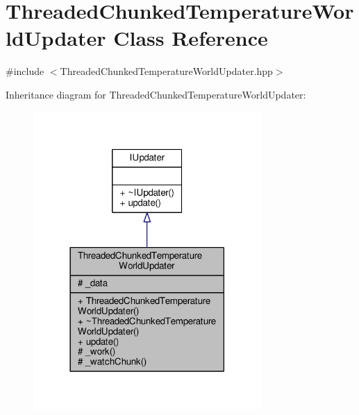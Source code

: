 \hypertarget{class_threaded_chunked_temperature_world_updater}{\section{Threaded\-Chunked\-Temperature\-World\-Updater Class Reference}
\label{class_threaded_chunked_temperature_world_updater}
}


{\ttfamily \#include $<$Threaded\-Chunked\-Temperature\-World\-Updater.\-hpp$>$}



Inheritance diagram for Threaded\-Chunked\-Temperature\-World\-Updater\-:
\nopagebreak
\begin{figure}[H]
\begin{center}
\leavevmode
\includegraphics[width=246pt]{class_threaded_chunked_temperature_world_updater__inherit__graph}
\end{center}
\end{figure}


